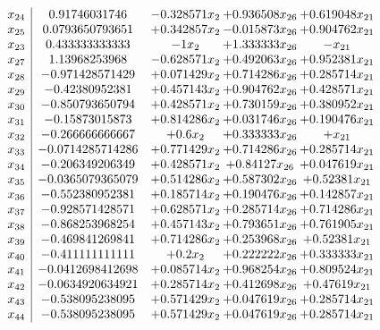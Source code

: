 \documentclass[11pt]{article}
\begin{document}
\[\begin{array}{c| c c@{\hskip 2pt} c@{\hskip 2pt} c@{\hskip 2pt} }
 x_{24}   &  0.91746031746 & -0.328571 x_{2} & + 0.936508 x_{26} & + 0.619048 x_{21}\\
 x_{25}   &  0.0793650793651 & + 0.342857 x_{2} & -0.015873 x_{26} & + 0.904762 x_{21}\\
 x_{23}   &  0.433333333333 & -1 x_{2} & + 1.333333 x_{26} & - x_{21}\\
 x_{27}   &  1.13968253968 & -0.628571 x_{2} & + 0.492063 x_{26} & + 0.952381 x_{21}\\
 x_{28}   &  -0.971428571429 & + 0.071429 x_{2} & + 0.714286 x_{26} & + 0.285714 x_{21}\\
 x_{29}   &  -0.42380952381 & + 0.457143 x_{2} & + 0.904762 x_{26} & + 0.428571 x_{21}\\
 x_{30}   &  -0.850793650794 & + 0.428571 x_{2} & + 0.730159 x_{26} & + 0.380952 x_{21}\\
 x_{31}   &  -0.15873015873 & + 0.814286 x_{2} & + 0.031746 x_{26} & + 0.190476 x_{21}\\
 x_{32}   &  -0.266666666667 & + 0.6 x_{2} & + 0.333333 x_{26} & +  x_{21}\\
 x_{33}   &  -0.0714285714286 & + 0.771429 x_{2} & + 0.714286 x_{26} & + 0.285714 x_{21}\\
 x_{34}   &  -0.206349206349 & + 0.428571 x_{2} & + 0.84127 x_{26} & + 0.047619 x_{21}\\
 x_{35}   &  -0.0365079365079 & + 0.514286 x_{2} & + 0.587302 x_{26} & + 0.52381 x_{21}\\
 x_{36}   &  -0.552380952381 & + 0.185714 x_{2} & + 0.190476 x_{26} & + 0.142857 x_{21}\\
 x_{37}   &  -0.928571428571 & + 0.628571 x_{2} & + 0.285714 x_{26} & + 0.714286 x_{21}\\
 x_{38}   &  -0.868253968254 & + 0.457143 x_{2} & + 0.793651 x_{26} & + 0.761905 x_{21}\\
 x_{39}   &  -0.469841269841 & + 0.714286 x_{2} & + 0.253968 x_{26} & + 0.52381 x_{21}\\
 x_{40}   &  -0.411111111111 & + 0.2 x_{2} & + 0.222222 x_{26} & + 0.333333 x_{21}\\
 x_{41}   &  -0.0412698412698 & + 0.085714 x_{2} & + 0.968254 x_{26} & + 0.809524 x_{21}\\
 x_{42}   &  -0.0634920634921 & + 0.285714 x_{2} & + 0.412698 x_{26} & + 0.47619 x_{21}\\
 x_{43}   &  -0.538095238095 & + 0.571429 x_{2} & + 0.047619 x_{26} & + 0.285714 x_{21}\\
 x_{44}   &  -0.538095238095 & + 0.571429 x_{2} & + 0.047619 x_{26} & + 0.285714 x_{21}\\

\end{array}\]
\end{document}
